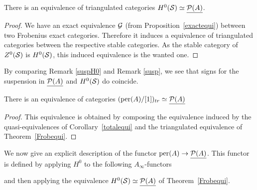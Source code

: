 \documentclass[12pt]{article}
\begin{document}
	\begin{theorem}
		\label{Frobequi}
		There is an equivalence of triangulated categories $H^0({\cal{S}}) \simeq \underline{{\cal{P}}(A)}$.
	\end{theorem}
	
	\begin{proof}
		We have an exact equivalence ${\cal{G}}$ (from Proposition~\ref{exactequi}) between two Frobenius exact categories. Therefore it induces a equivalence of triangulated categories between the respective stable categories. As the stable category of $Z^0({\cal{S}})$ is $H^0({\cal{S}})$, this induced equivalence is the wanted one.
	\end{proof}
	
	\begin{remark}
		By comparing Remark \ref{suspH0} and Remark \ref{susp}, we see that signs for the suspension in $\underline{{\cal{P}}(A)}$ and $H^0({\cal{S}})$ do coincide.
	\end{remark}
	
	\begin{corollary}
		\label{main}
		There is an equivalence of categories $(\textup{per}(A)/[1])_{tr} \simeq \underline{{\cal{P}}(A)}$
	\end{corollary}
	
	\begin{proof}
		This equivalence is obtained by composing the equivalence induced by the quasi-equivalences of Corollary~\ref{totalequi} and the triangulated equivalence of Theorem~\ref{Frobequi}.
	\end{proof}
	
	We now give an explicit description of the functor $\textup{per}(A) \to \underline{{\cal{P}}(A)}$. This functor is defined by applying $H^0$ to the following $A_\infty$-functors 
	
	and then applying the equivalence $H^0({\cal{S}}) \simeq \underline{{\cal{P}}(A)}$ of Theorem~\ref{Frobequi}.
	
\end{document}
